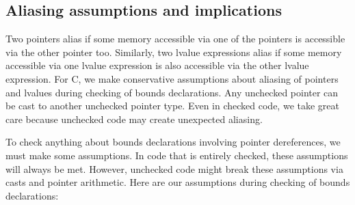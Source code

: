 \subsection{Aliasing assumptions and implications}

Two pointers alias if some memory accessible via one of the pointers is accessible via
the other pointer too.  Similarly, two lvalue expressions alias if some memory accessible via
one lvalue expression is also accessible via the other lvalue expression.
For C, we  make conservative assumptions about
aliasing of pointers and lvalues during checking of bounds declarations.  
Any unchecked pointer can be cast to another unchecked
pointer type.  Even in checked code, we take great care because unchecked code
may create unexpected aliasing.  

To check anything about bounds declarations involving pointer dereferences, we must make some
assumptions.  In code that is entirely checked, these assumptions will always be met.  However,
unchecked code might break these assumptions via casts and pointer arithmetic.   Here are our
assumptions during checking of bounds declarations:
